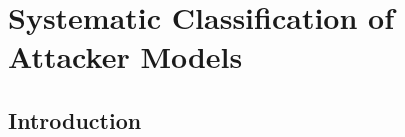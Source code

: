 \chapter{Systematic Classification of Attacker Models} %
\label{ch:Classification}
\section{Introduction}


